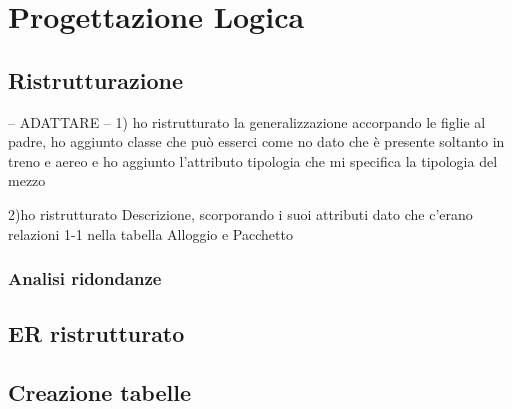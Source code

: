\section{Progettazione Logica}
\subsection{Ristrutturazione}
-- ADATTARE --
1) ho ristrutturato la generalizzazione accorpando le figlie al padre, ho aggiunto classe che può esserci come no
dato che è presente soltanto in treno e aereo e ho aggiunto l'attributo tipologia che mi specifica la tipologia del mezzo

2)ho ristrutturato Descrizione, scorporando i suoi attributi dato che c'erano relazioni 1-1 nella tabella Alloggio e Pacchetto
\subsubsection{Analisi ridondanze}
\subsection{ER ristrutturato}
\subsection{Creazione tabelle}